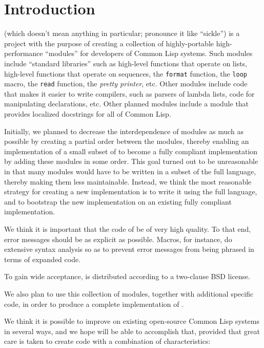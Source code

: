 \chapter{Introduction}
%

\sysname{} (which doesn't mean anything in particular; pronounce it
like ``sickle'') is a project with the purpose of creating a
collection of highly-portable high-performance ``modules'' for
developers of Common Lisp systems.  Such modules include ``standard
libraries'' such as high-level functions that operate on lists,
high-level functions that operate on sequences, the \texttt{format}
function, the \texttt{loop} macro, the \texttt{read} function, the
\emph{pretty printer}, etc.  Other modules include code that makes it
easier to write compilers, such as parsers of lambda lists, code for
manipulating declarations, etc.  Other planned modules include a
module that provides localized docstrings for all of Common Lisp.

Initially, we planned to decrease the interdependence of modules as
much as possible by creating a partial order between the modules,
thereby enabling an implementation of a small subset of \commonlisp{}
to become a fully compliant implementation by adding these modules in
some order.  This goal turned out to be unreasonable in that many
modules would have to be written in a subset of the full language,
thereby making them less maintainable.  Instead, we think the most
reasonable strategy for creating a new \commonlisp{} implementation is
to write it using the full language, and to bootstrap the new
implementation on an existing fully compliant implementation.

We think it is important that the code of
\sysname{} be of very high quality.  To that end, error messages
should be as explicit as possible.  Macros, for instance, do extensive
syntax analysis so as to prevent error messages from being phrased in
terms of expanded code.

To gain wide acceptance, \sysname{} is distributed according to a
two-clause BSD license.

We also plan to use this collection of modules, together with
additional specific code, in order to produce a complete
implementation of \commonlisp{}.

We think it is possible to improve on existing open-source Common Lisp
systems in several ways, and we hope \sysname{} will be able to
accomplish that, provided that great care is taken to create code with
a combination of characteristics:

